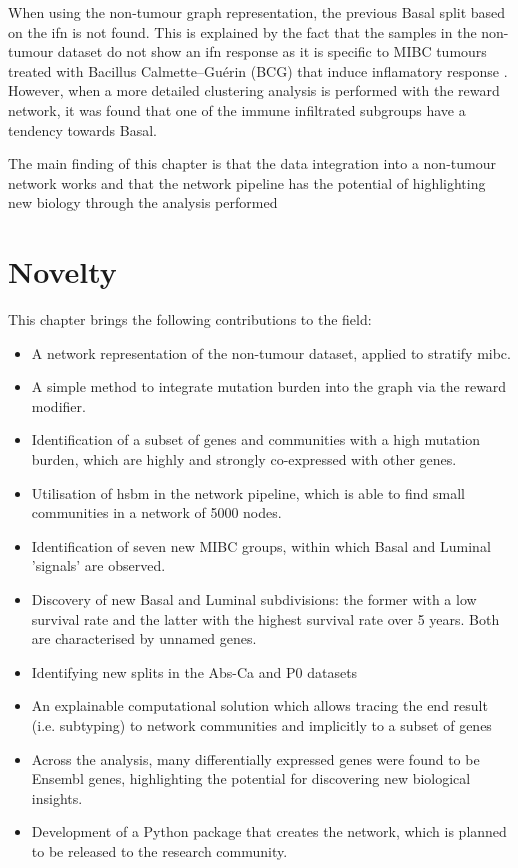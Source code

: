 When using the non-tumour graph representation, the previous Basal split based on the \acrfull{ifn} is not found. This is explained by the fact that the samples in the non-tumour dataset do not show an \acrshort{ifn} response as it is specific to MIBC tumours treated with Bacillus Calmette–Guérin (BCG) that induce inflamatory response \citep{Baker2022-bj}. However, when a more detailed clustering analysis is performed with the reward network, it was found that one of the immune infiltrated subgroups have a tendency towards Basal.

The main finding of this chapter is that the data integration into a non-tumour network works and that the network pipeline has the potential of highlighting new biology through the analysis performed

\newpage

\section{Novelty}

This chapter brings the following contributions to the field:
\begin{itemize}
    \item A network representation of the non-tumour dataset, applied to stratify \acrfull{mibc}.
    \item A simple method to integrate mutation burden into the graph via the reward modifier.
    \item Identification of a subset of genes and communities with a high mutation burden, which are highly and strongly co-expressed with other genes.
    \item Utilisation of \acrfull{hsbm} in the network pipeline, which is able to find small communities in a network of 5000 nodes.
    \item Identification of seven new MIBC groups, within which Basal and Luminal 'signals' are observed.
    \item Discovery of new Basal and Luminal subdivisions: the former with a low survival rate and the latter with the highest survival rate over 5 years. Both are characterised by unnamed genes.
    \item Identifying new splits in the Abs-Ca and P0 datasets
    \item An explainable computational solution which allows tracing the end result (i.e. subtyping) to network communities and implicitly to a subset of genes
    \item Across the analysis, many differentially expressed genes were found to be Ensembl genes, highlighting the potential for discovering new biological insights.
    \item Development of a Python package that creates the network, which is planned to be released to the research community.
\end{itemize}


